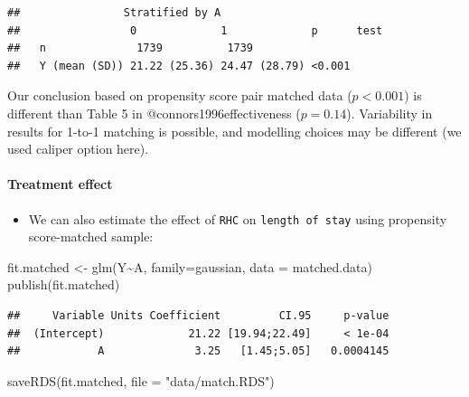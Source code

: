 \documentclass[
]{book}
\newenvironment{Shaded}{\begin{snugshade}}{\end{snugshade}}
\newcommand{\AttributeTok}[1]{\textcolor[rgb]{0.77,0.63,0.00}{#1}}
\newcommand{\FunctionTok}[1]{\textcolor[rgb]{0.00,0.00,0.00}{#1}}
\newcommand{\NormalTok}[1]{#1}
\newcommand{\OtherTok}[1]{\textcolor[rgb]{0.56,0.35,0.01}{#1}}
\newcommand{\SpecialCharTok}[1]{\textcolor[rgb]{0.00,0.00,0.00}{#1}}
\newcommand{\StringTok}[1]{\textcolor[rgb]{0.31,0.60,0.02}{#1}}
\providecommand{\tightlist}{%
  \setlength{\itemsep}{0pt}\setlength{\parskip}{0pt}}
\begin{document}
\begin{verbatim}
##                Stratified by A
##                 0             1             p      test
##   n              1739          1739                    
##   Y (mean (SD)) 21.22 (25.36) 24.47 (28.79) <0.001
\end{verbatim}

\begin{rmdcomment}
Our conclusion based on propensity score pair matched data
(\(p \lt 0.001\)) is different than Table 5 in @connors1996effectiveness
(\(p = 0.14\)). Variability in results for 1-to-1 matching is possible,
and modelling choices may be different (we used caliper option here).
\end{rmdcomment}

\hypertarget{treatment-effect}{%
\paragraph{Treatment effect}\label{treatment-effect}}

\begin{itemize}
\tightlist
\item
  We can also estimate the effect of \texttt{RHC} on \texttt{length\ of\ stay} using propensity score-matched sample:
\end{itemize}

\begin{Shaded}
\begin{Highlighting}[]
\NormalTok{fit.matched }\OtherTok{\textless{}{-}} \FunctionTok{glm}\NormalTok{(Y}\SpecialCharTok{\textasciitilde{}}\NormalTok{A,}
            \AttributeTok{family=}\NormalTok{gaussian,  }
            \AttributeTok{data =}\NormalTok{ matched.data)  }
\FunctionTok{publish}\NormalTok{(fit.matched)}
\end{Highlighting}
\end{Shaded}

\begin{verbatim}
##     Variable Units Coefficient         CI.95     p-value 
##  (Intercept)             21.22 [19.94;22.49]     < 1e-04 
##            A              3.25   [1.45;5.05]   0.0004145
\end{verbatim}

\begin{Shaded}
\begin{Highlighting}[]
\FunctionTok{saveRDS}\NormalTok{(fit.matched, }\AttributeTok{file =} \StringTok{"data/match.RDS"}\NormalTok{)   }
\end{Highlighting}
\end{Shaded}
\end{document}
